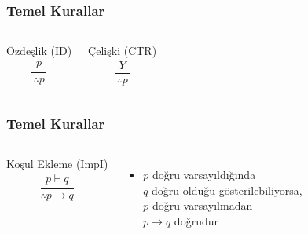 \documentclass[dvipsnames]{beamer}
\theoremstyle{definition}
\theoremstyle{example}
\theoremstyle{plain}
\begin{document}
\begin{frame}
  \frametitle{Temel Kurallar}

  \begin{columns}
    \begin{block}{Özdeşlik (ID)}
      \[
      \frac
        {
          \begin{array}{c}
            p
          \end{array}
        }
        {
          \therefore p
        }
      \]
    \end{block}

    \pause
    \begin{block}{Çelişki (CTR)}
    \[
    \frac
      {
        \begin{array}{c}
          Y
        \end{array}
      }
      {
        \therefore p
      }
    \]
    \end{block}
  \end{columns}
\end{frame}

\begin{frame}
  \frametitle{Temel Kurallar}

  \begin{columns}
    \begin{block}{Koşul Ekleme (ImpI)}
      \[
      \frac
        {
          \begin{array}{c}
            p \vdash q
          \end{array}
        }
        {
          \therefore p \rightarrow q
        }
      \]
    \end{block}

    \pause
    \begin{itemize}
      \item $p$ doğru varsayıldığında\\
        $q$ doğru olduğu gösterilebiliyorsa,\\
        \alert{$p$ doğru varsayılmadan}\\
        $p \rightarrow q$ doğrudur
    \end{itemize}
  \end{columns}
\end{frame}
\end{document}
